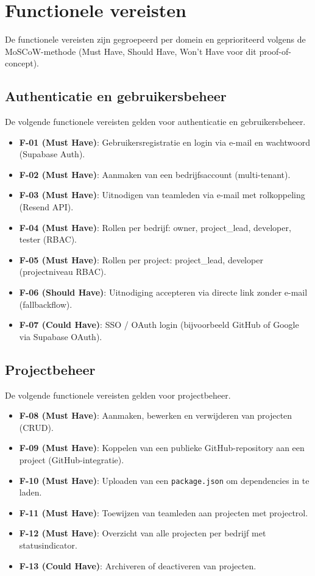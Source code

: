 \section{Functionele vereisten}
\label{sec:functionele-vereisten}

De functionele vereisten zijn gegroepeerd per domein en geprioriteerd volgens de MoSCoW-methode (Must Have, Should Have, Won't Have voor dit proof-of-concept).

\subsection{Authenticatie en gebruikersbeheer}
\label{sec:auth-gebruikersbeheer}

De volgende functionele vereisten gelden voor authenticatie en gebruikersbeheer.

\begin{itemize}
  \item \textbf{F-01 (Must Have)}: Gebruikersregistratie en login via e-mail en wachtwoord (Supabase Auth).
  \item \textbf{F-02 (Must Have)}: Aanmaken van een bedrijfsaccount (multi-tenant).
  \item \textbf{F-03 (Must Have)}: Uitnodigen van teamleden via e-mail met rolkoppeling (Resend API).
  \item \textbf{F-04 (Must Have)}: Rollen per bedrijf: owner, project\_lead, developer, tester (RBAC).
  \item \textbf{F-05 (Must Have)}: Rollen per project: project\_lead, developer (projectniveau RBAC).
  \item \textbf{F-06 (Should Have)}: Uitnodiging accepteren via directe link zonder e-mail (fallbackflow).
  \item \textbf{F-07 (Could Have)}: SSO / OAuth login (bijvoorbeeld GitHub of Google via Supabase OAuth).
\end{itemize}


\subsection{Projectbeheer}
\label{sec:projectbeheer}

De volgende functionele vereisten gelden voor projectbeheer.

\begin{itemize}
  \item \textbf{F-08 (Must Have)}: Aanmaken, bewerken en verwijderen van projecten (CRUD).
  \item \textbf{F-09 (Must Have)}: Koppelen van een publieke GitHub-repository aan een project (GitHub-integratie).
  \item \textbf{F-10 (Must Have)}: Uploaden van een \texttt{package.json} om dependencies in te laden.
  \item \textbf{F-11 (Must Have)}: Toewijzen van teamleden aan projecten met projectrol.
  \item \textbf{F-12 (Must Have)}: Overzicht van alle projecten per bedrijf met statusindicator.
  \item \textbf{F-13 (Could Have)}: Archiveren of deactiveren van projecten.
\end{itemize}


